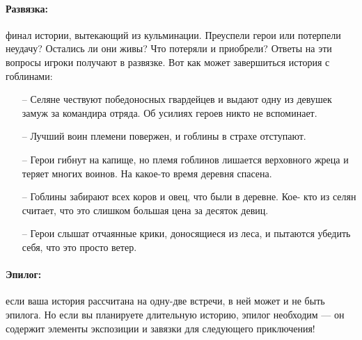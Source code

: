 \paragraph{Развязка:} финал истории, вытекающий из кульминации. Преуспели герои или потерпели неудачу? Остались ли они живы? Что потеряли и приобрели? Ответы на эти вопросы игроки получают в развязке. Вот как может завершиться история с гоблинами:
\begin{itemize}
\item[--] Селяне чествуют победоносных гвардейцев и выдают одну из девушек замуж за командира отряда. Об усилиях героев никто не вспоминает.
\item[--] Лучший воин племени повержен, и гоблины в страхе отступают.
\item[--] Герои гибнут на капище, но племя гоблинов лишается верховного жреца и теряет многих воинов. На какое-то время деревня спасена.
\item[--] Гоблины забирают всех коров и овец, что были в деревне. Кое- кто из селян считает, что это слишком большая цена за десяток девиц.
\item[--] Герои слышат отчаянные крики, доносящиеся из леса, и пытаются убедить себя, что это просто ветер.
\end{itemize}
\paragraph{Эпилог:} если ваша история рассчитана на одну-две встречи, в ней может и не быть эпилога. Но если вы планируете длительную историю, эпилог необходим — он содержит элементы экспозиции и завязки для следующего приключения!